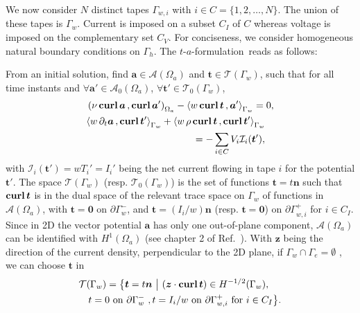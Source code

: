 \documentclass[journal]{IEEEtran}
\renewcommand{\vec}[1]{\boldsymbol{#1}} %
\newcommand{\paren}[1]{\left(#1\right)}
\newcommand{\parenangle}[1]{\left\langle#1\right\rangle}
\newcommand{\volInt}[3]{\paren{#1 \, , #2}_{#3}}
\newcommand{\surInt}[3]{\parenangle{#1 \, , #2}_{#3}}
\newcommand{\curl}{\text{\textbf{curl}}\, }
\newcommand{\curlOnly}{\text{\textbf{curl}}}
\renewcommand{\a}{\vec a}
\renewcommand{\t}{\vec t}
\newcommand{\n}{\vec n}
\newcommand{\dt}{\partial_t}
\newcommand{\Oa}{\Omega_a}
\newcommand{\taf}{$t$-$a$-formulation\ }
\newcommand{\asp}{\mathcal{A}}
\newcommand{\tsp}{\mathcal{T}}
\newcommand{\aspz}{\mathcal{A}_{0}}
\newcommand{\tspz}{\mathcal{T}_{0}}
\begin{document}
We now consider $N$ distinct tapes $\Gamma_{w,i}$ with $i\in C = \{1,2,\dots,N\}$. The union of these tapes is $\Gamma_w$. Current is imposed on a subset $C_I$ of $C$ whereas voltage is imposed on the complementary set $C_V$. For conciseness, we consider homogeneous natural boundary conditions on $\Gamma_h$. %
The \taf reads as follows:

From an initial solution, find $\a \in \asp(\Oa)$ and $\t \in \tsp(\Gamma_w)$, such that for all time instants and $\forall \a' \in \aspz(\Oa)$, $\forall \t' \in \tspz(\Gamma_w)$,%
\begin{align}\label{taformulation}
& \volInt{\nu\, \curl \a}{\curl \a'}{\Oa} - \surInt{w\, \curl \t}{\a'}{\Gamma_w} = 0,\notag\\
&\begin{aligned}[t]
\surInt{w\, \dt \a}{\curl \t'}{\Gamma_w} + \surInt{w\, \rho\, \curl \t}{\curl \t'}{\Gamma_w} \\
 =-  \sum_{i\in C} V_i\mathcal{I}_i(\t'),
\end{aligned}
\end{align}
with $\mathcal{I}_i(\t') = w T_i'=I_i'$ being the net current flowing in tape $i$ for the potential $\t'$. The space $\tsp(\Gamma_w)$ (resp. $\tspz(\Gamma_w)$) is the set of functions $\t = t\n$ such that $\curl \t$ is in the dual space of the relevant trace space on $\Gamma_w$ of functions in $\asp(\Oa)$, with $\t = \vec 0$ on $\partial\Gamma_w^-$, and $\t = (I_i/w) \n$ (resp. $\t =\vec 0$) on $\partial\Gamma_{w,i}^+$ for $i\in C_I$. Since in 2D the vector potential $\a$ has only one out-of-plane component, $\asp(\Oa)$ can be identified with $H^1(\Oa)$ (see chapter 2 of Ref.~\cite{brezziBook}). With $\vec z$ being the direction of the current density, perpendicular to the 2D plane, if $\Gamma_w\cap \Gamma_e=\emptyset$ \cite{bechet2009stable}, we can choose $\t$ in
\begin{align}
&\tsp(\Gamma_w) = \big\{\t = t\n\ \big|\ (\vec z\cdot \curl \t) \in H^{-1/2}(\Gamma_w),\notag \\
&\quad t=0 \text{ on } \partial \Gamma_w^-\ , t =I_i/w \text { on } \partial \Gamma_{w,i}^+ \text{ for } i\in C_I \big\}.
\end{align}
\end{document}
